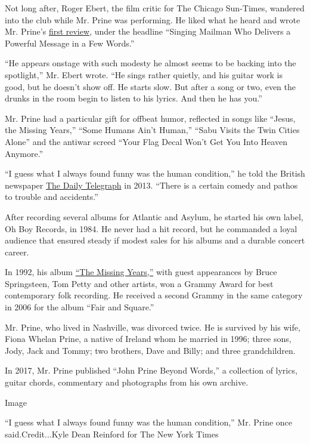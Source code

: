 Not long after, Roger Ebert, the film critic for The Chicago Sun-Times,
wandered into the club while Mr. Prine was performing. He liked what he
heard and wrote Mr. Prine's
\href{http://www.rogerebert.com/balder-and-dash/john-prine-american-legend}{first
review}, under the headline ``Singing Mailman Who Delivers a Powerful
Message in a Few Words.''

``He appears onstage with such modesty he almost seems to be backing
into the spotlight,'' Mr. Ebert wrote. ``He sings rather quietly, and
his guitar work is good, but he doesn't show off. He starts slow. But
after a song or two, even the drunks in the room begin to listen to his
lyrics. And then he has you.''

Mr. Prine had a particular gift for offbeat humor, reflected in songs
like ``Jesus, the Missing Years,'' ``Some Humans Ain't Human,'' ``Sabu
Visits the Twin Cities Alone'' and the antiwar screed ``Your Flag Decal
Won't Get You Into Heaven Anymore.''

``I guess what I always found funny was the human condition,'' he told
the British newspaper
\href{http://www.telegraph.co.uk/culture/music/rockandpopfeatures/9853440/John-Prine-I-find-the-human-condition-funny.html}{The
Daily Telegraph} in 2013. ``There is a certain comedy and pathos to
trouble and accidents.''

After recording several albums for Atlantic and Asylum, he started his
own label, Oh Boy Records, in 1984. He never had a hit record, but he
commanded a loyal audience that ensured steady if modest sales for his
albums and a durable concert career.

In 1992, his album
\href{https://www.youtube.com/watch?v=6jKopYJfjeQ\&list=OLAK5uy_lBOa4ysIPMfrphlG1IqSDyeubh6uwC-vk}{``The
Missing Years,''} with guest appearances by Bruce Springsteen, Tom Petty
and other artists, won a Grammy Award for best contemporary folk
recording. He received a second Grammy in the same category in 2006 for
the album ``Fair and Square.''

Mr. Prine, who lived in Nashville, was divorced twice. He is survived by
his wife, Fiona Whelan Prine, a native of Ireland whom he married in
1996; three sons, Jody, Jack and Tommy; two brothers, Dave and Billy;
and three grandchildren.

In 2017, Mr. Prine published ``John Prine Beyond Words,'' a collection
of lyrics, guitar chords, commentary and photographs from his own
archive.

Image

``I guess what I always found funny was the human condition,'' Mr. Prine
once said.Credit...Kyle Dean Reinford for The New York Times

